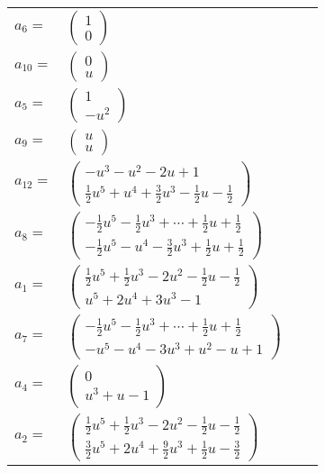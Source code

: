 \documentclass[1p]{elsarticle_modified}
\theoremstyle{definition}
\begin{document}
\begin{tabular}{m{7pt} m{180pt} m{7pt} m{180pt} }
\flushright $a_{6}=$&$\begin{pmatrix}1\\0\end{pmatrix}$ \\
\flushright $a_{10}=$&$\begin{pmatrix}0\\u\end{pmatrix}$ \\
\flushright $a_{5}=$&$\begin{pmatrix}1\\- u^2\end{pmatrix}$ \\
\flushright $a_{9}=$&$\begin{pmatrix}u\\u\end{pmatrix}$ \\
\flushright $a_{12}=$&$\begin{pmatrix}- u^3- u^2-2 u+1\\\frac{1}{2} u^5+u^4+\frac{3}{2} u^3-\frac{1}{2} u-\frac{1}{2}\end{pmatrix}$ \\
\flushright $a_{8}=$&$\begin{pmatrix}-\frac{1}{2} u^5-\frac{1}{2} u^3+\cdots+\frac{1}{2} u+\frac{1}{2}\\-\frac{1}{2} u^5- u^4-\frac{3}{2} u^3+\frac{1}{2} u+\frac{1}{2}\end{pmatrix}$ \\
\flushright $a_{1}=$&$\begin{pmatrix}\frac{1}{2} u^5+\frac{1}{2} u^3-2 u^2-\frac{1}{2} u-\frac{1}{2}\\u^5+2 u^4+3 u^3-1\end{pmatrix}$ \\
\flushright $a_{7}=$&$\begin{pmatrix}-\frac{1}{2} u^5-\frac{1}{2} u^3+\cdots+\frac{1}{2} u+\frac{1}{2}\\- u^5- u^4-3 u^3+u^2- u+1\end{pmatrix}$ \\
\flushright $a_{4}=$&$\begin{pmatrix}0\\u^3+u-1\end{pmatrix}$ \\
\flushright $a_{2}=$&$\begin{pmatrix}\frac{1}{2} u^5+\frac{1}{2} u^3-2 u^2-\frac{1}{2} u-\frac{1}{2}\\\frac{3}{2} u^5+2 u^4+\frac{9}{2} u^3+\frac{1}{2} u-\frac{3}{2}\end{pmatrix}$ \\

\end{tabular}
\end{document}
